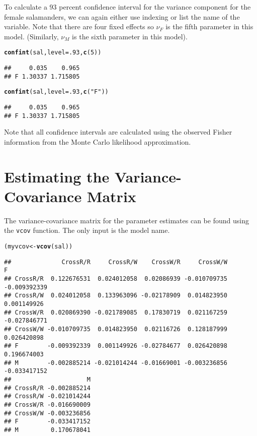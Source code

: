 \documentclass[11pt]{article}\usepackage[]{graphicx}\usepackage[]{color}
\makeatletter
\newcommand{\hlnum}[1]{\textcolor[rgb]{0.686,0.059,0.569}{#1}}%
\newcommand{\hlstr}[1]{\textcolor[rgb]{0.192,0.494,0.8}{#1}}%
\newcommand{\hlstd}[1]{\textcolor[rgb]{0.345,0.345,0.345}{#1}}%
\newcommand{\hlkwb}[1]{\textcolor[rgb]{0.69,0.353,0.396}{#1}}%
\newcommand{\hlkwc}[1]{\textcolor[rgb]{0.333,0.667,0.333}{#1}}%
\newcommand{\hlkwd}[1]{\textcolor[rgb]{0.737,0.353,0.396}{\textbf{#1}}}%
\newenvironment{kframe}{%
 \def\at@end@of@kframe{}%
 \ifinner\ifhmode%
  \def\at@end@of@kframe{\end{minipage}}%
  \begin{minipage}{\columnwidth}%
 \fi\fi%
 \def\FrameCommand##1{\hskip\@totalleftmargin \hskip-\fboxsep
 \colorbox{shadecolor}{##1}\hskip-\fboxsep
     \hskip-\linewidth \hskip-\@totalleftmargin \hskip\columnwidth}%
 \MakeFramed {\advance\hsize-\width
   \@totalleftmargin\z@ \linewidth\hsize
   \@setminipage}}%
 {\par\unskip\endMakeFramed%
 \at@end@of@kframe}
\newenvironment{knitrout}{}{} %
\makeatother
\begin{document}
To calculate a $93$ percent confidence interval for the variance component for the female salamanders, we can again either use indexing or list the name of the variable. Note that there are four fixed effects so $\nu_F$ is the fifth parameter in this model. (Similarly, $\nu_M$ is the sixth parameter in this model).
\begin{knitrout}
\color{fgcolor}\begin{kframe}
\begin{alltt}
\hlkwd{confint}\hlstd{(sal,}\hlkwc{level}\hlstd{=}\hlnum{.93}\hlstd{,}\hlkwd{c}\hlstd{(}\hlnum{5}\hlstd{))}
\end{alltt}
\begin{verbatim}
##     0.035    0.965
## F 1.30337 1.715805
\end{verbatim}
\begin{alltt}
\hlkwd{confint}\hlstd{(sal,}\hlkwc{level}\hlstd{=}\hlnum{.93}\hlstd{,}\hlkwd{c}\hlstd{(}\hlstr{"F"}\hlstd{))}
\end{alltt}
\begin{verbatim}
##     0.035    0.965
## F 1.30337 1.715805
\end{verbatim}
\end{kframe}
\end{knitrout}

Note that all confidence intervals are calculated using the observed Fisher information from the Monte Carlo likelihood approximation.\\

\section{Estimating the Variance-Covariance Matrix}
The variance-covariance matrix for the parameter estimates can be found using the \texttt{vcov} function. The only input is the model name.\\

\begin{knitrout}
\color{fgcolor}\begin{kframe}
\begin{alltt}
\hlstd{(myvcov} \hlkwb{<-} \hlkwd{vcov}\hlstd{(sal))}
\end{alltt}
\begin{verbatim}
##              CrossR/R     CrossR/W    CrossW/R     CrossW/W            F
## CrossR/R  0.122676531  0.024012058  0.02086939 -0.010709735 -0.009392339
## CrossR/W  0.024012058  0.133963096 -0.02178909  0.014823950  0.001149926
## CrossW/R  0.020869390 -0.021789085  0.17830719  0.021167259 -0.027846771
## CrossW/W -0.010709735  0.014823950  0.02116726  0.128187999  0.026420898
## F        -0.009392339  0.001149926 -0.02784677  0.026420898  0.196674003
## M        -0.002885214 -0.021014244 -0.01669001 -0.003236856 -0.033417152
##                     M
## CrossR/R -0.002885214
## CrossR/W -0.021014244
## CrossW/R -0.016690009
## CrossW/W -0.003236856
## F        -0.033417152
## M         0.170678041
\end{verbatim}
\end{kframe}
\end{knitrout}
\end{document}
